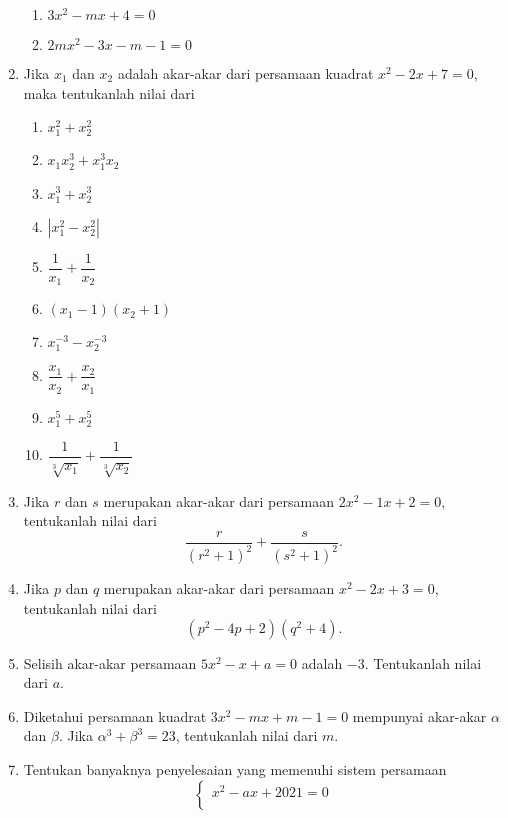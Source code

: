 \begin{enumerate}[topsep=0pt]
\begin{multcols}
\begin{enumerate}
					\item $ 3x^{2} - mx + 4 = 0 $
					\item $ 2mx^{2} - 3x - m - 1 = 0 $
				\end{enumerate}
			\end{multcols}
			\item Jika $ x_{1} $ dan $ x_{2} $ adalah akar-akar dari persamaan kuadrat $ x^{2} - 2x + 7 = 0 $, maka tentukanlah nilai dari
			\begin{multcols}
				\begin{enumerate}
					\item $ x_{1}^{2} + x_{2}^{2} $
					\item $ x_{1}x_{2}^{3} + x_{1}^{3}x_{2} $
					\item $ x_{1}^{3} + x_{2}^{3} $
					\item $ \left|x_{1}^{2} - x_{2}^{2}\right| $
					\item $ \dfrac{1}{x_{1}} + \dfrac{1}{x_{2}} $
					\item $ \left(x_{1} - 1\right)\left(x_{2} + 1\right) $
					\item $ x_{1}^{-3} - x_{2}^{-3} $
					\item $ \dfrac{x_{1}}{x_{2}} + \dfrac{x_{2}}{x_{1}} $
					\item $ x_{1}^{5} + x_{2}^{5} $
					\item $ \dfrac{1}{\sqrt[3]{x_{1}}} + \dfrac{1}{\sqrt[3]{x_{2}}} $
				\end{enumerate}
			\end{multcols}
			\item Jika $ r $ dan $ s $ merupakan akar-akar dari persamaan $ 2x^{2} - 1x + 2 = 0 $, tentukanlah nilai dari
			\[ \frac{r}{\left(r^{2} + 1\right)^{2}} + \frac{s}{\left(s^{2} + 1\right)^{2}}. \]
			\item Jika $ p $ dan $ q $ merupakan akar-akar dari persamaan $ x^{2} - 2x + 3 = 0 $, tentukanlah nilai dari
			\[ \left(p^{2} - 4p + 2\right)\left(q^{2} + 4\right). \]
			\item Selisih akar-akar persamaan $ 5x^{2} - x + a = 0 $ adalah $ -3 $. Tentukanlah nilai dari $ a $.
			\item Diketahui persamaan kuadrat $ 3x^{2} - mx + m - 1 = 0 $ mempunyai akar-akar $ \alpha $ dan $ \beta $. Jika $ \alpha^{3} + \beta^{3} = 23 $, tentukanlah nilai dari $ m $.
			\item Tentukan banyaknya penyelesaian yang memenuhi sistem persamaan
			\[
				\begin{cases}
					x^{2} - ax + 2021 = 0 \\

\end{cases}\]
\end{enumerate}

